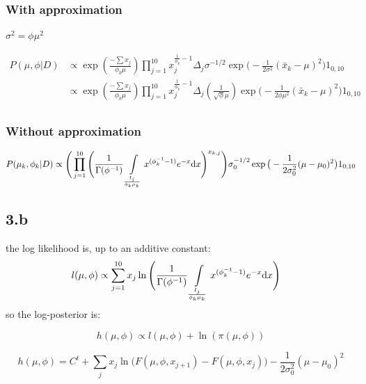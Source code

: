 \documentclass[a4paper, 12pt]{article}
\begin{document}
    \hypertarget{with-approximation}{%
    \subsubsection{With approximation}\label{with-approximation}}

    \(\sigma^2 = \phi \mu^2\)

    \[
    \begin{split}
    P(\mu, \phi | D) & \propto \exp{(\frac{- \sum x_j}{\phi_k \mu})}  \prod_{j=1}^{10}  x_j^{\frac{1}{\phi_k}-1}  \Delta_j \sigma^{-1/2} \exp{ \big(-\frac{1}{2\sigma^2}(\bar{x}_k-\mu)^2\big) } 1_{0,10} \\ 
    & \propto \exp{(\frac{- \sum x_j}{\phi_k \mu})}  \prod_{j=1}^{10}  x_j^{\frac{1}{\phi_k}-1}  \Delta_j (\frac{1}{\sqrt{\phi} \mu}) \exp{ \big(-\frac{1}{2 \phi \mu^2}(\bar{x}_k-\mu)^2\big) } 1_{0,10} \\
    \end{split}
    \]

    \hypertarget{without-approximation}{%
    \subsubsection{Without approximation}\label{without-approximation}}

    \[
    \begin{split}
    P(\mu_k, \phi_k | D) \propto  \Bigg( \prod_{j=1}^{10} \Bigg( \frac{1}{\Gamma(\phi^{-1})} \int\limits_{ \frac{I_j}{\phi_k \mu_k}} x^{(\phi_k^{-1}-1)} e^{-x} \mathrm{d} x \Bigg)^{x_{k,j}} \Bigg)  \sigma_0^{-1/2} \exp{ \big(-\frac{1}{2\sigma_0^2}(\mu-\mu_0)^2\big) } 1_{0;10}
    \end{split}
    \]

    \hypertarget{b}{%
    \subsection{3.b}\label{b}}

    the log likelihood is, up to an additive constant: \[
    \begin{split}
    l(\mu,\phi) & \propto  \sum_{j=1}^{10} x_j \ln{\Bigg(\frac{1}{\Gamma(\phi^{-1})} \int\limits_{ \frac{I_j}{\phi_k \mu_k}} x^{(\phi_k^{-1}-1)} e^{-x} \mathrm{d}x \Bigg)}
    \end{split}
    \] so the log-posterior is:

    \[
    h(\mu,\phi) \propto  l(\mu,\phi) + \ln(\pi(\mu,\phi))
    \]

    \[
    h(\mu,\phi) = C^t +  \sum_j x_j \ln{\big(F(\mu,\phi,x_{j+1})-F(\mu,\phi,x_{j})  \big)} - \frac{1}{2 \sigma_0^2} (\mu-\mu_0)^2
    \]
\end{document}
